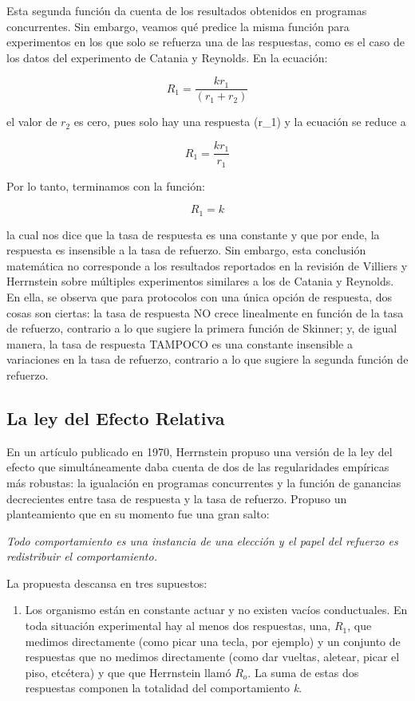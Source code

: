 \documentclass[
  letterpaper,
]{book}
\providecommand{\tightlist}{%
  \setlength{\itemsep}{0pt}\setlength{\parskip}{0pt}}\usepackage{longtable,booktabs,array}
\begin{document}
Esta segunda función da cuenta de los resultados obtenidos en programas
concurrentes. Sin embargo, veamos qué predice la misma función para
experimentos en los que solo se refuerza una de las respuestas, como es
el caso de los datos del experimento de Catania y Reynolds. En la
ecuación:

\[R_1 = \frac {kr_1} {(r_1 + r_2)}\]

el valor de \(r_2\) es cero, pues solo hay una respuesta (r\_1) y la
ecuación se reduce a

\[R_1 = \frac {kr_1} {r_1 }\]

Por lo tanto, terminamos con la función:

\[R_1 = k\]

la cual nos dice que la tasa de respuesta es una constante y que por
ende, la respuesta es insensible a la tasa de refuerzo. Sin embargo,
esta conclusión matemática no corresponde a los resultados reportados en
la revisión de Villiers y Herrnstein sobre múltiples experimentos
similares a los de Catania y Reynolds. En ella, se observa que para
protocolos con una única opción de respuesta, dos cosas son ciertas: la
tasa de respuesta NO crece linealmente en función de la tasa de
refuerzo, contrario a lo que sugiere la primera función de Skinner; y,
de igual manera, la tasa de respuesta TAMPOCO es una constante
insensible a variaciones en la tasa de refuerzo, contrario a lo que
sugiere la segunda función de refuerzo.

\subsection{La ley del Efecto
Relativa}\label{la-ley-del-efecto-relativa}

En un artículo publicado en 1970, Herrnstein propuso una versión de la
ley del efecto que simultáneamente daba cuenta de dos de las
regularidades empíricas más robustas: la igualación en programas
concurrentes y la función de ganancias decrecientes entre tasa de
respuesta y la tasa de refuerzo. Propuso un planteamiento que en su
momento fue una gran salto:

\emph{Todo comportamiento es una instancia de una elección y el papel
del refuerzo es redistribuir el comportamiento.}

La propuesta descansa en tres supuestos:

\begin{enumerate}
\def\labelenumi{\arabic{enumi}.}
\tightlist
\item
  Los organismo están en constante actuar y no existen vacíos
  conductuales. En toda situación experimental hay al menos dos
  respuestas, una, \(R_1\), que medimos directamente (como picar una
  tecla, por ejemplo) y un conjunto de respuestas que no medimos
  directamente (como dar vueltas, aletear, picar el piso, etcétera) y
  que que Herrnstein llamó \(R_o\). La suma de estas dos respuestas
  componen la totalidad del comportamiento \emph{k}.
\end{enumerate}
\end{document}
